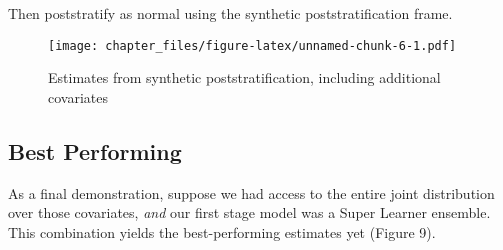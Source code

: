 \documentclass[
]{article}
\newenvironment{Shaded}{\begin{snugshade}}{\end{snugshade}}
\newcommand{\AttributeTok}[1]{\textcolor[rgb]{0.77,0.63,0.00}{#1}}
\newcommand{\CommentTok}[1]{\textcolor[rgb]{0.56,0.35,0.01}{\textit{#1}}}
\newcommand{\FunctionTok}[1]{\textcolor[rgb]{0.00,0.00,0.00}{#1}}
\newcommand{\NormalTok}[1]{#1}
\newcommand{\OtherTok}[1]{\textcolor[rgb]{0.56,0.35,0.01}{#1}}
\newcommand{\SpecialCharTok}[1]{\textcolor[rgb]{0.00,0.00,0.00}{#1}}
\newcommand{\StringTok}[1]{\textcolor[rgb]{0.31,0.60,0.02}{#1}}
\begin{document}
Then poststratify as normal using the synthetic poststratification
frame.

\begin{Shaded}
\end{Shaded}

\begin{figure}
\centering
\texttt{[image: chapter\_files/figure-latex/unnamed-chunk-6-1.pdf]}
\caption{Estimates from synthetic poststratification, including
additional covariates}
\end{figure}

\hypertarget{best-performing}{%
\subsection{Best Performing}\label{best-performing}}

As a final demonstration, suppose we had access to the entire joint
distribution over those covariates, \emph{and} our first stage model was
a Super Learner ensemble. This combination yields the best-performing
estimates yet (Figure 9).
\end{document}
